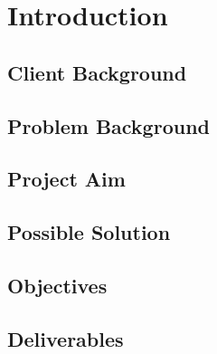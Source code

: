 \chapter{Introduction}
\label{chapter1}

\section{Client Background}
\lipsum[1-1] \cite{parikh1980adaptive}

\section{Problem Background}
\lipsum[1-1] \cite{parikh1980adaptive}

\section{Project Aim}
\lipsum[1-1] \cite{parikh1980adaptive}

\section{Possible Solution}
\lipsum[1-1] \cite{parikh1980adaptive}

\section{Objectives}
\lipsum[1-1] \cite{parikh1980adaptive}

\section{Deliverables}
\lipsum[1-1] \cite{parikh1980adaptive}